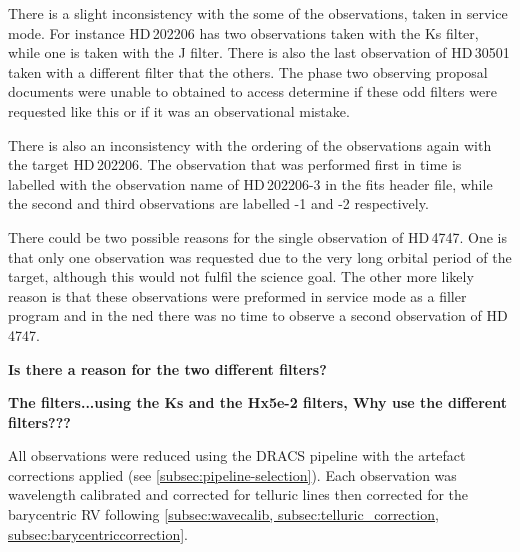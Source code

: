 There is a slight inconsistency with the some of the observations, taken in service mode.
For instance {HD\,202206} has two observations taken with the {Ks} filter, while one is taken with the {J} filter.
There is also the last observation of {HD\,30501} taken with a different filter that  the others.
The phase two observing proposal documents were unable to obtained to access determine if these odd filters were requested like this or if it was an observational mistake.

There is also an inconsistency with the ordering of the observations again with the target {HD\,202206}.
The observation that was performed first in time is labelled with the observation name of {HD\,202206-3} in the fits header file, while the second and third observations are labelled -1 and -2 respectively.

There could be two possible reasons for the single observation of {HD\,4747}.
One is that only one observation was requested due to the very long orbital period of the target, although this would not fulfil the science goal. 
The other more likely reason is that these observations were preformed in service mode as a filler program and in the ned there was no time to observe a second observation of {HD\,4747}.

\textbf{Is there a reason for the two different filters?}



\textbf{The filters...using the {Ks} and the {Hx5e-2} filters, Why use the different filters???}

All observations were reduced using the {DRACS} pipeline with the artefact corrections applied (see \cref{subsec:pipeline-selection}).
Each observation was wavelength calibrated and corrected for telluric lines then corrected for the barycentric RV following  \cref{subsec:wavecalib, subsec:telluric_correction, subsec:barycentriccorrection}.


